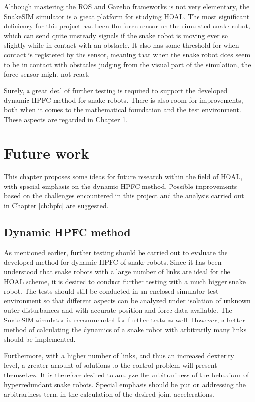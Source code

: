 Although mastering the ROS and Gazebo frameworks is not very elementary, the SnakeSIM simulator is a great platform for studying HOAL. The most significant deficiency for this project has been the force sensor on the simulated snake robot, which can send quite unsteady signals if the snake robot is moving ever so slightly while in contact with an obstacle. It also has some threshold for when contact is registered by the sensor, meaning that when the snake robot does seem to be in contact with obstacles judging from the visual part of the simulation, the force sensor might not react.

Surely, a great deal of further testing is required to support the developed dynamic HPFC method for snake robots. There is also room for improvements, both when it comes to the mathematical foundation and the test environment. These aspects are regarded in Chapter \ref{ch:future}.

\chapter{Future work}\label{ch:future}

This chapter proposes some ideas for future research within the field of HOAL, with special emphasis on the dynamic HPFC method. Possible improvements based on the challenges encountered in this project and the analysis carried out in Chapter \ref{ch:hpfc} are suggested.

\section{Dynamic HPFC method}

As mentioned earlier, further testing should be carried out to evaluate the developed method for dynamic HPFC of snake robots. Since it has been understood that snake robots with a large number of links are ideal for the HOAL scheme, it is desired to conduct further testing with a much bigger snake robot. The tests should still be conducted in an enclosed simulator test environment so that different aspects can be analyzed under isolation of unknown outer disturbances and with accurate position and force data available. The SnakeSIM simulator is recommended for further tests as well. However, a better method of calculating the dynamics of a snake robot with arbitrarily many links should be implemented.

Furthermore, with a higher number of links, and thus an increased dexterity level, a greater amount of solutions to the control problem will present themselves. It is therefore desired to analyze the arbitrariness of the behaviour of hyperredundant snake robots. Special emphasis should be put on addressing the arbitrariness term in the calculation of the desired joint accelerations.

